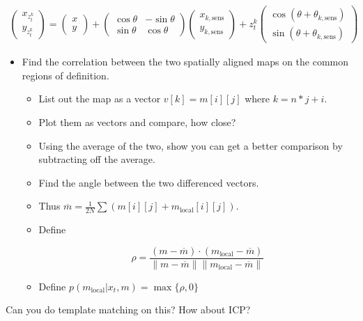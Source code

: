 \[\begin{aligned}
\begin{pmatrix} x_{z_t^k}\\y_{z_t^k} \end{pmatrix} =
  \begin{pmatrix}x \\ y \end{pmatrix} + \begin{pmatrix} \cos\theta &
    -\sin\theta \\ \sin\theta & \cos\theta\end{pmatrix}
     \begin{pmatrix}x_{k,\mbox{sens}}\\y_{k,\mbox{sens}}\end{pmatrix}
     + z_t^k \begin{pmatrix}\cos (\theta + \theta_{k,\mbox{sens}}) \\
     \sin (\theta + \theta_{k,\mbox{sens}})\end{pmatrix}
\end{aligned}\]

\begin{itemize}
\tightlist
\item
  Find the correlation between the two spatially aligned maps on the
  common regions of definition.

  \begin{itemize}
  \item
    List out the map as a vector \(v[k] = m[i][j]\) where \(k=n*j+i\).
  \item
    Plot them as vectors and compare, how close?
  \item
    Using the average of the two, show you can get a better comparison
    by subtracting off the average.
  \item
    Find the angle between the two differenced vectors.
  \item
    Thus
    \(\overline{m} = \frac{1}{2N} \sum \left( m[i][j] + m_{\mbox{local}}[i][j]\right)\).
  \item
    Define

    \[\rho = \frac{(m - \overline{m})\cdot (m_{\mbox{local}} -\overline{m})}{\|m - \overline{m}\| \| m_{\mbox{local}} -\overline{m}\|}\]
  \item
    Define \(p(m_{\mbox{local}}|x_t,m) = \max \{\rho , 0\}\)
  \end{itemize}
\end{itemize}

Can you do template matching on this? How about ICP?

